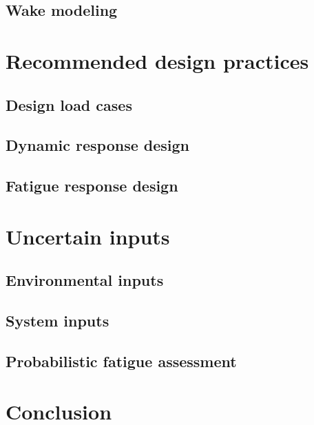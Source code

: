     \subsection{Wake modeling }
\section{Recommended design practices}
    \subsection{Design load cases}
    \subsection{Dynamic response design}
    \subsection{Fatigue response design}
\section{Uncertain inputs}
    \subsection{Environmental inputs}
    \subsection{System inputs}
    \subsection{Probabilistic fatigue assessment}
\section{Conclusion}